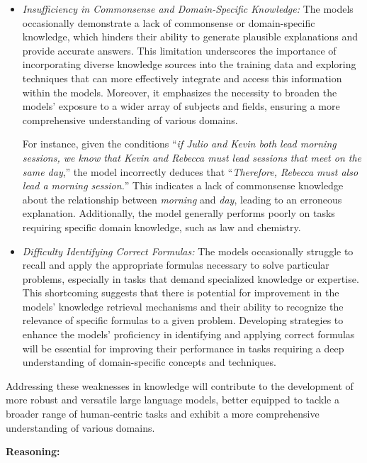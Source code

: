 \begin{itemize}
\item \textit{Insufficiency in Commonsense and Domain-Specific Knowledge:} The models occasionally demonstrate a lack of commonsense or domain-specific knowledge, which hinders their ability to generate plausible explanations and provide accurate answers. This limitation underscores the importance of incorporating diverse knowledge sources into the training data and exploring techniques that can more effectively integrate and access this information within the models. Moreover, it emphasizes the necessity to broaden the models' exposure to a wider array of subjects and fields, ensuring a more comprehensive understanding of various domains.

For instance, given the conditions ``\textit{if Julio and Kevin both lead morning sessions, we know that Kevin and Rebecca must lead sessions that meet on the same day},'' the model incorrectly deduces that ``\textit{Therefore, Rebecca must also lead a morning session.}'' This indicates a lack of commonsense knowledge about the relationship between \textit{morning} and \textit{day}, leading to an erroneous explanation. Additionally, the model generally performs poorly on tasks requiring specific domain knowledge, such as law and chemistry.

\item \textit{Difficulty Identifying Correct Formulas:} The models occasionally struggle to recall and apply the appropriate formulas necessary to solve particular problems, especially in tasks that demand specialized knowledge or expertise. This shortcoming suggests that there is potential for improvement in the models' knowledge retrieval mechanisms and their ability to recognize the relevance of specific formulas to a given problem. Developing strategies to enhance the models' proficiency in identifying and applying correct formulas will be essential for improving their performance in tasks requiring a deep understanding of domain-specific concepts and techniques.
\end{itemize}

Addressing these weaknesses in knowledge will contribute to the development of more robust and versatile large language models, better equipped to tackle a broader range of human-centric tasks and exhibit a more comprehensive understanding of various domains.

\textbf{Reasoning:}

